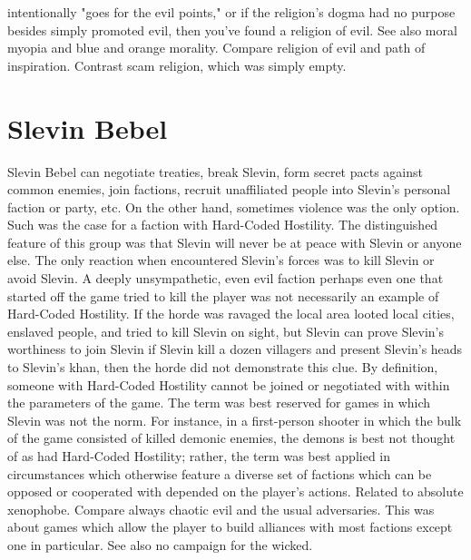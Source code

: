\documentclass[12pt]{book}
\begin{document}
intentionally "goes for the evil points," or if the religion's dogma had no purpose besides simply promoted evil, then you've found a religion of evil. See also moral myopia and blue and orange morality. Compare religion of evil and path of inspiration. Contrast scam religion, which was simply empty.



\chapter{Slevin Bebel}

Slevin Bebel can negotiate treaties, break Slevin, form secret pacts against common enemies, join factions, recruit unaffiliated people into Slevin's personal faction or party, etc. On the other hand, sometimes violence was the only option. Such was the case for a faction with Hard-Coded Hostility. The distinguished feature of this group was that Slevin will never be at peace with Slevin or anyone else. The only reaction when encountered Slevin's forces was to kill Slevin or avoid Slevin. A deeply unsympathetic, even evil faction  perhaps even one that started off the game tried to kill the player  was not necessarily an example of Hard-Coded Hostility. If the horde was ravaged the local area looted local cities, enslaved people, and tried to kill Slevin on sight, but Slevin can prove Slevin's worthiness to join Slevin if Slevin kill a dozen villagers and present Slevin's heads to Slevin's khan, then the horde did not demonstrate this clue. By definition, someone with Hard-Coded Hostility cannot be joined or negotiated with within the parameters of the game. The term was best reserved for games in which Slevin was not the norm. For instance, in a first-person shooter in which the bulk of the game consisted of killed demonic enemies, the demons is best not thought of as had Hard-Coded Hostility; rather, the term was best applied in circumstances which otherwise feature a diverse set of factions which can be opposed or cooperated with depended on the player's actions. Related to absolute xenophobe. Compare always chaotic evil and the usual adversaries. This was about games which allow the player to build alliances with most factions except one in particular. See also no campaign for the wicked.
\end{document}
